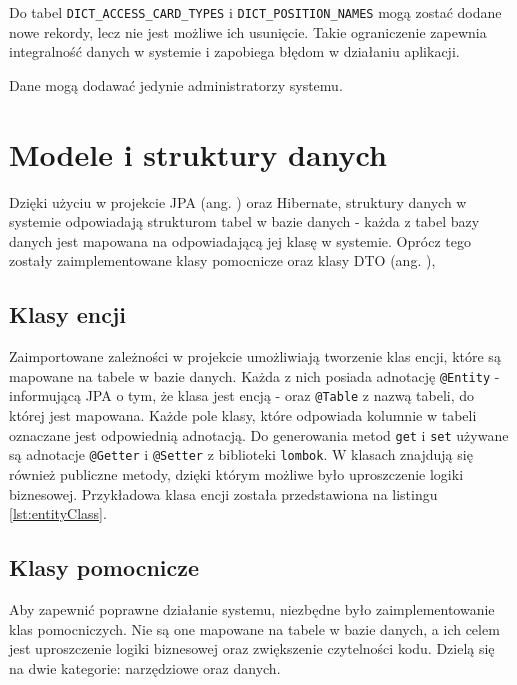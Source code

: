 Do tabel \texttt{DICT\_ACCESS\_CARD\_TYPES} i \texttt{DICT\_POSITION\_NAMES} mogą zostać dodane nowe rekordy, lecz nie jest możliwe ich usunięcie. Takie ograniczenie zapewnia integralność danych w systemie i zapobiega błędom w działaniu aplikacji.

Dane mogą dodawać jedynie administratorzy systemu.

\section{Modele i struktury danych}


Dzięki użyciu w projekcie JPA (ang. ) oraz Hibernate, struktury danych w systemie odpowiadają strukturom tabel w bazie danych - każda z tabel bazy danych jest mapowana na odpowiadającą jej klasę w systemie. Oprócz tego zostały zaimplementowane klasy pomocnicze oraz klasy DTO (ang. ),

\subsection{Klasy encji}

Zaimportowane zależności w projekcie umożliwiają tworzenie klas encji, które są mapowane na tabele w bazie danych. Każda z nich posiada adnotację \texttt{@Entity} - informującą JPA o tym, że klasa jest encją - oraz \texttt{@Table} z nazwą tabeli, do której jest mapowana. Każde pole klasy, które odpowiada kolumnie w tabeli oznaczane jest odpowiednią adnotacją. Do generowania metod \texttt{get} i \texttt{set} używane są adnotacje \texttt{@Getter} i \texttt{@Setter} z biblioteki \texttt{lombok}. W klasach znajdują się również publiczne metody, dzięki którym możliwe było uproszczenie logiki biznesowej. Przykładowa klasa encji została przedstawiona na listingu \ref{lst:entityClass}.

\subsection{Klasy pomocnicze}

Aby zapewnić poprawne działanie systemu, niezbędne było zaimplementowanie klas pomocniczych. Nie są one mapowane na tabele w bazie danych, a ich celem jest uproszczenie logiki biznesowej oraz zwiększenie czytelności kodu. Dzielą się na dwie kategorie: narzędziowe oraz danych.

